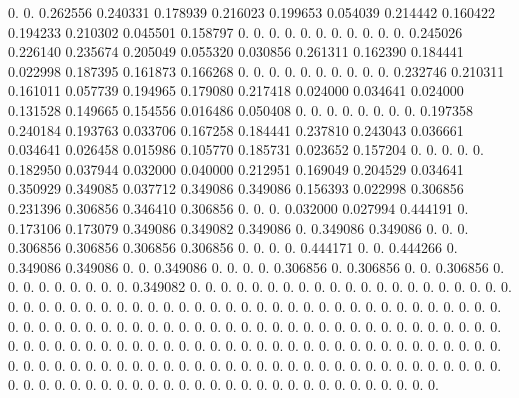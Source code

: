 0.  0.  0.262556   0.240331   0.178939   0.216023   0.199653   0.054039   0.214442   0.160422   0.194233   0.210302   0.045501   0.158797   0.  0.  0.  0.  0.  0.  0.  0.  0.  
0.  0.  0.245026   0.226140   0.235674   0.205049   0.055320   0.030856   0.261311   0.162390   0.184441   0.022998   0.187395   0.161873   0.166268   0.  0.  0.  0.  0.  0.  0.  0.  
0.  0.  0.232746   0.210311   0.161011   0.057739   0.194965   0.179080   0.217418   0.024000   0.034641   0.024000   0.131528   0.149665   0.154556   0.016486   0.050408   0.  0.  0.  0.  0.  0.  
0.  0.  0.197358   0.240184   0.193763   0.033706   0.167258   0.184441   0.237810   0.243043   0.036661   0.034641   0.026458   0.015986   0.105770   0.185731   0.023652   0.157204   0.  0.  0.  0.  0.  
0.182950   0.037944   0.032000   0.040000   0.212951   0.169049   0.204529   0.034641   0.350929   0.349085   0.037712   0.349086   0.349086   0.156393   0.022998   0.306856   0.231396   0.306856   0.346410   0.306856   0.  0.  0.  
0.032000   0.027994   0.444191   0.  0.173106   0.173079   0.349086   0.349082   0.349086   0.  0.349086   0.349086   0.  0.  0.  0.306856   0.306856   0.306856   0.306856   0.  0.  0.  0.  
0.444171   0.  0.  0.444266   0.  0.349086   0.349086   0.  0.  0.349086   0.  0.  0.  0.  0.306856   0.  0.306856   0.  0.  0.306856   0.  0.  0.  
0.  0.  0.  0.  0.  0.  0.349082   0.  0.  0.  0.  0.  0.  0.  0.  0.  0.  0.  0.  0.  0.  0.  0.  
0.  0.  0.  0.  0.  0.  0.  0.  0.  0.  0.  0.  0.  0.  0.  0.  0.  0.  0.  0.  0.  0.  0.  
0.  0.  0.  0.  0.  0.  0.  0.  0.  0.  0.  0.  0.  0.  0.  0.  0.  0.  0.  0.  0.  0.  0.  
0.  0.  0.  0.  0.  0.  0.  0.  0.  0.  0.  0.  0.  0.  0.  0.  0.  0.  0.  0.  0.  0.  0.  
0.  0.  0.  0.  0.  0.  0.  0.  0.  0.  0.  0.  0.  0.  0.  0.  0.  0.  0.  0.  0.  0.  0.  
0.  0.  0.  0.  0.  0.  0.  0.  0.  0.  0.  0.  0.  0.  0.  0.  0.  0.  0.  0.  0.  0.  0.  
0.  0.  0.  0.  0.  0.  0.  0.  0.  0.  0.  0.  0.  0.  0.  0.  0.  0.  0.  0.  0.  0.  0.  
0.  0.  0.  0.  0.  0.  0.  0.  0.  0.  0.  0.  0.  0.  0.  0.  0.  0.  0.  0.  0.  0.  0.  
